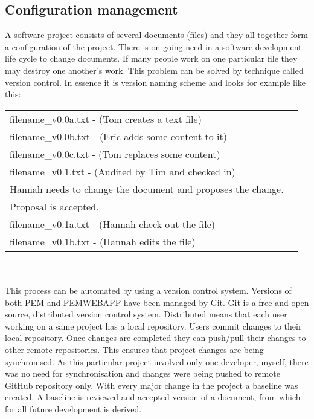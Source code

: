 \documentclass[12pt, a4paper]{report}   %
\begin{document}
\begin{enumerate}
\subsection{Configuration management}
A software project consists of several documents (files) and they all together form a configuration of the project. There is on-going need in a software development life cycle to change documents. If many people work on one particular file they may destroy one another's work. This problem can be solved by technique called version control. In essence it is version naming scheme and looks for example like this:\\


\begin{tabular}{ll}
filename\_v0.0a.txt - (Tom creates a text file)\\
filename\_v0.0b.txt - (Eric adds some content to it)\\
filename\_v0.0c.txt - (Tom replaces some content)\\
filename\_v0.1.txt - (Audited by Tim and checked in)\\
Hannah needs to change the document and proposes the change.\\
Proposal is accepted.\\
filename\_v0.1a.txt - (Hannah check out the file)\\
filename\_v0.1b.txt - (Hannah edits the file)\\
\end{tabular}\\ \\	
	
	
This process can be automated by using a version control system. Versions of both PEM and PEMWEBAPP have been managed by Git. Git is a free and open source, distributed version control system. Distributed means that each user working on a same project has a local repository. Users commit changes to their local repository. Once changes are completed they can push/pull their changes to other remote repositories. This ensures that project changes are being synchronised. As this particular project involved only one developer, myself, there was no need for synchronisation and changes were being pushed to remote GitHub repository only.
With every major change in the project a baseline was created. A baseline is reviewed and accepted version of a document, from which for all future development is derived.\\ \\
	
	
\clearpage

\end{enumerate}
\end{document}

